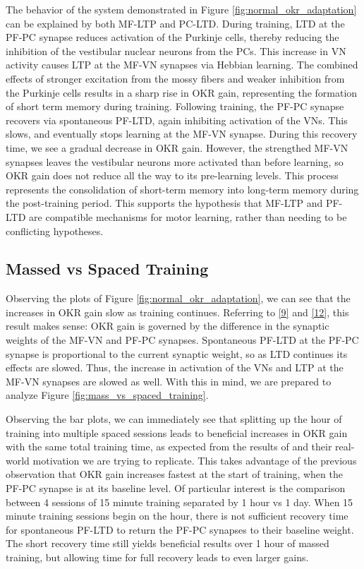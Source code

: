\documentclass[10pt]{article}
\begin{document}
The behavior of the system demonstrated in Figure \ref{fig:normal_okr_adaptation} can be explained by both MF-LTP and PC-LTD. During training, LTD at the PF-PC synapse reduces activation of the Purkinje cells, thereby reducing the inhibition of the vestibular nuclear neurons from the PCs. This increase in VN activity causes LTP at the MF-VN synapses via Hebbian learning. The combined effects of stronger excitation from the mossy fibers and weaker inhibition from the Purkinje cells results in a sharp rise in OKR gain, representing the formation of short term memory during training. Following training, the PF-PC synapse recovers via spontaneous PF-LTD, again inhibiting activation of the VNs. This slows, and eventually stops learning at the MF-VN synapse. During this recovery time, we see a gradual decrease in OKR gain. However, the strengthed MF-VN synapses leaves the vestibular neurons more activated than before learning, so OKR gain does not reduce all the way to its pre-learning levels. This process represents the consolidation of short-term memory into long-term memory during the post-training period. This supports the hypothesis that MF-LTP and PF-LTD are compatible mechanisms for motor learning, rather than needing to be conflicting hypotheses.

\subsection{Massed vs Spaced Training}

Observing the plots of Figure \ref{fig:normal_okr_adaptation}, we can see that the increases in OKR gain slow as training continues. Referring to \eqref{9} and \eqref{12}, this result makes sense: OKR gain is governed by the difference in the synaptic weights of the MF-VN and PF-PC synapses. Spontaneous PF-LTD at the PF-PC synapse is proportional to the current synaptic weight, so as LTD continues its effects are slowed. Thus, the increase in activation of the VNs and LTP at the MF-VN synapses are slowed  as well. With this in mind, we are prepared to analyze Figure \ref{fig:mass_vs_spaced_training}.

Observing the bar plots, we can immediately see that splitting up the hour of training into multiple spaced sessions leads to beneficial increases in OKR gain with the same total training time, as expected from the results of \cite{yamazaki2015modeling} and their real-world motivation we are trying to replicate. This takes advantage of the previous observation that OKR gain increases fastest at the start of training, when the PF-PC synapse is at its baseline level. Of particular interest is the comparison between 4 sessions of 15 minute training separated by 1 hour vs 1 day. When 15 minute training sessions begin on the hour, there is not sufficient recovery time for spontaneous PF-LTD to return the PF-PC synapses to their baseline weight. The short recovery time still yields beneficial results over 1 hour of massed training, but allowing time for full recovery leads to even larger gains.
\end{document}
